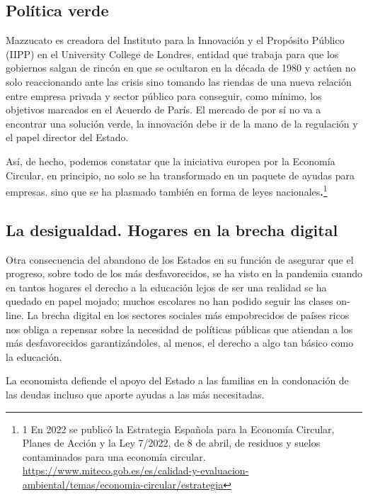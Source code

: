 \documentclass[
]{article}
\begin{document}
\hypertarget{poluxedtica-verde}{%
\subsection{Política verde}\label{poluxedtica-verde}}

Mazzucato es creadora del Instituto para la Innovación y el Propósito
Público (IIPP) en el University College de Londres, entidad que trabaja
para que los gobiernos salgan de rincón en que se ocultaron en la década
de 1980 y actúen no solo reaccionando ante las crisis sino tomando las
riendas de una nueva relación entre empresa privada y sector público
para conseguir, como mínimo, los objetivos marcados en el Acuerdo de
París. El mercado de por sí no va a encontrar una solución verde, la
innovación debe ir de la mano de la regulación y el papel director del
Estado.

Así, de hecho, podemos constatar que la iniciativa europea por la
Economía Circular, en principio, no solo se ha transformado en un
paquete de ayudas para empresas. sino que se ha plasmado también en
forma de leyes nacionales\textbf{.}\footnote{1 En 2022 se publicó la
  Estrategia Española para la Economía Circular, Planes de Acción y la
  Ley 7/2022, de 8 de abril, de residuos y suelos contaminados para una
  economía circular.
  \url{https://www.miteco.gob.es/es/calidad-y-evaluacion-ambiental/temas/economia-circular/estrategia}}

\hypertarget{la-desigualdad.-hogares-en-la-brecha-digital}{%
\subsection{La desigualdad. Hogares en la brecha
digital}\label{la-desigualdad.-hogares-en-la-brecha-digital}}

Otra consecuencia del abandono de los Estados en su función de asegurar
que el progreso, sobre todo de los más desfavorecidos, se ha visto en la
pandemia cuando en tantos hogares el derecho a la educación lejos de ser
una realidad se ha quedado en papel mojado; muchos escolares no han
podido seguir las clases on-line. La brecha digital en los sectores
sociales más empobrecidos de países ricos nos obliga a repensar sobre la
necesidad de políticas públicas que atiendan a los más desfavorecidos
garantizándoles, al menos, el derecho a algo tan básico como la
educación.

La economista defiende el apoyo del Estado a las familias en la
condonación de las deudas incluso que aporte ayudas a las más
necesitadas.
\end{document}
